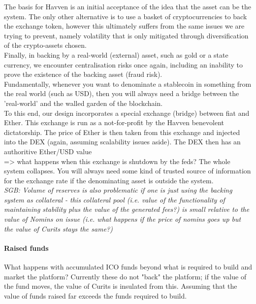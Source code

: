 \documentclass{article}
\begin{document}
\noindent The basis for Havven is an initial acceptance of the idea that the asset can be the system. The only other alternative is to use a basket of cryptocurrencies to back the exchange token, however this ultimately suffers from the same issues we are trying to prevent, namely volatility that is only mitigated through diversification of the crypto-assets chosen. \\

\noindent Finally, in backing by a real-world (external) asset, such as gold or a state currency, we encounter centralisation risks once again, including an inability to prove the existence of the backing asset (fraud risk). \\

\noindent Fundamentally, whenever you want to denominate a stablecoin in something from the real world (such as USD), then you will always need a bridge between the 'real-world' and the walled garden of the blockchain. \\

\noindent To this end, our design incorporates a special exchange (bridge) between fiat and Ether. This exchange is run as a not-for-profit by the Havven benevolent dictatorship. The price of Ether is then taken from this exchange and injected into the DEX (again, assuming scalability issues aside). The DEX then has an authoritive Ether/USD value  \\

\noindent => what happens when this exchange is shutdown by the feds? The whole system collapses. You will always need some kind of trusted source of information for the exchange rate if the denominating asset is outside the system. \\

\noindent \textit{SGB: Volume of reserves is also problematic if one is just using the backing system as collateral - this collateral pool (i.e. value of the functionality of maintaining stability plus the value of the generated fees?) is small relative to the value of Nomins on issue (i.e. what happens if the price of nomins goes up but the value of Curits stays the same?)} \\

\paragraph{Raised funds}

What happens with accumulated ICO funds beyond what is required to build and market the platform? Currently these do not "back" the platform; if the value of the fund moves, the value of Curits is insulated from this. Assuming that the value of funds raised far exceeds the funds required to build. \\
\end{document}
